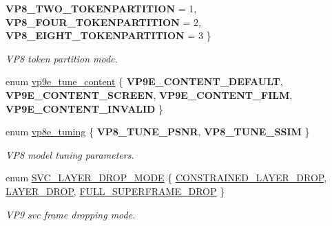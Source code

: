 \begin{DoxyCompactItemize}
{\bfseries V\+P8\+\_\+\+T\+W\+O\+\_\+\+T\+O\+K\+E\+N\+P\+A\+R\+T\+I\+T\+I\+ON} = 1, 
{\bfseries V\+P8\+\_\+\+F\+O\+U\+R\+\_\+\+T\+O\+K\+E\+N\+P\+A\+R\+T\+I\+T\+I\+ON} = 2, 
{\bfseries V\+P8\+\_\+\+E\+I\+G\+H\+T\+\_\+\+T\+O\+K\+E\+N\+P\+A\+R\+T\+I\+T\+I\+ON} = 3
 \}\begin{DoxyCompactList}\small\item\em V\+P8 token partition mode. \end{DoxyCompactList}
\item 
enum \hyperlink{group__vp8__encoder_ga76d4298d5ee58718597f307a290211a9}{vp9e\+\_\+tune\+\_\+content} \{ {\bfseries V\+P9\+E\+\_\+\+C\+O\+N\+T\+E\+N\+T\+\_\+\+D\+E\+F\+A\+U\+LT}, 
{\bfseries V\+P9\+E\+\_\+\+C\+O\+N\+T\+E\+N\+T\+\_\+\+S\+C\+R\+E\+EN}, 
{\bfseries V\+P9\+E\+\_\+\+C\+O\+N\+T\+E\+N\+T\+\_\+\+F\+I\+LM}, 
{\bfseries V\+P9\+E\+\_\+\+C\+O\+N\+T\+E\+N\+T\+\_\+\+I\+N\+V\+A\+L\+ID}
 \}
\item 
enum \hyperlink{group__vp8__encoder_ga371dbc29054b3d46364af996ad42ab94}{vp8e\+\_\+tuning} \{ {\bfseries V\+P8\+\_\+\+T\+U\+N\+E\+\_\+\+P\+S\+NR}, 
{\bfseries V\+P8\+\_\+\+T\+U\+N\+E\+\_\+\+S\+S\+IM}
 \}\begin{DoxyCompactList}\small\item\em V\+P8 model tuning parameters. \end{DoxyCompactList}
\item 
enum \hyperlink{group__vp8__encoder_ga3205681fab504015432ce09e6e3fdce4}{S\+V\+C\+\_\+\+L\+A\+Y\+E\+R\+\_\+\+D\+R\+O\+P\+\_\+\+M\+O\+DE} \{ \hyperlink{group__vp8__encoder_gga3205681fab504015432ce09e6e3fdce4a84363e856c23be36b1cec8e6f86d6712}{C\+O\+N\+S\+T\+R\+A\+I\+N\+E\+D\+\_\+\+L\+A\+Y\+E\+R\+\_\+\+D\+R\+OP}, 
\hyperlink{group__vp8__encoder_gga3205681fab504015432ce09e6e3fdce4a91fdaca8868dbd1a1c073bf1675c134c}{L\+A\+Y\+E\+R\+\_\+\+D\+R\+OP}, 
\hyperlink{group__vp8__encoder_gga3205681fab504015432ce09e6e3fdce4a6ae5f6715816a5d8af0f880a46604753}{F\+U\+L\+L\+\_\+\+S\+U\+P\+E\+R\+F\+R\+A\+M\+E\+\_\+\+D\+R\+OP}
 \}\begin{DoxyCompactList}\small\item\em V\+P9 svc frame dropping mode. \end{DoxyCompactList}
\end{DoxyCompactItemize}
